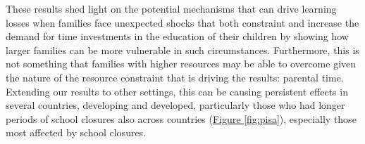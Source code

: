 


These results shed light on the potential mechanisms that can drive learning losses when families face unexpected shocks that both constraint and increase the demand for time investments in the education of their children by showing how larger families can be more vulnerable in such circumstances. Furthermore, this is not something that families with higher resources may be able to overcome given the nature of the resource constraint that is driving the results: parental time. Extending our results to other settings, this can be causing persistent effects in several countries, developing and developed, particularly those who had longer periods of school closures also across countries (\hyperref[fig:pisa]{Figure \ref{fig:pisa}}), especially those most affected by school closures.

